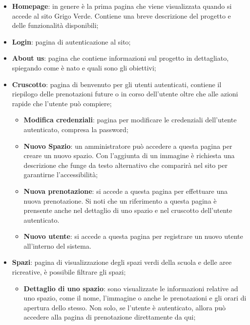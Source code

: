\begin{itemize}
	\item \textbf{Homepage}: in genere è la prima pagina che viene visualizzata
	      quando si accede al sito Grigo Verde. Contiene una breve descrizione
	      del progetto e delle funzionalità disponibili;

	\item \textbf{Login}: pagina di autenticazione al sito;

	\item \textbf{About us}: pagina che contiene informazioni sul progetto in
	      dettagliato, spiegando come è nato e quali sono gli obiettivi;

	\item \textbf{Cruscotto}: pagina di benvenuto per gli utenti autenticati,
	      contiene il riepilogo delle prenotazioni future o in corso dell'utente
	      oltre che alle azioni rapide che l'utente può compiere;

	      \begin{itemize}
		      \item \textbf{Modifica credenziali}: pagina per modificare le
		            credenziali dell'utente autenticato, compresa la password;

		      \item \textbf{Nuovo Spazio}: un amministratore può accedere a
		            questa pagina per creare un nuovo spazio. Con l'aggiunta di un 
					immagine è richiesta una descrizione che funge da testo alternativo
					che comparirà nel sito per garantirne l'accessibilità;

		      \item \textbf{Nuova prenotazione}: si accede a questa pagina per
		            effettuare una nuova prenotazione. Si noti che un
		            riferimento a questa pagina è prensente anche nel dettaglio
		            di uno spazio e nel cruscotto dell'utente autenticato.

		      \item \textbf{Nuovo utente}: si accede a questa pagina per
		            registrare un nuovo utente all'interno del sistema.
	      \end{itemize}

	\item \textbf{Spazi}: pagina di visualizzazione degli spazi verdi della
	      scuola e delle aree ricreative, è possibile filtrare gli spazi;

	      \begin{itemize}
		      \item \textbf{Dettaglio di uno spazio}: sono visualizzate le
		            informazioni relative ad uno spazio, come il nome,
		            l'immagine o anche le prenotazioni e gli orari di apertura
		            dello stesso. Non solo, se l'utente è autenticato, allora
		            può accedere alla pagina di prenotazione direttamente da
		            qui;


\end{itemize}
\end{itemize}
